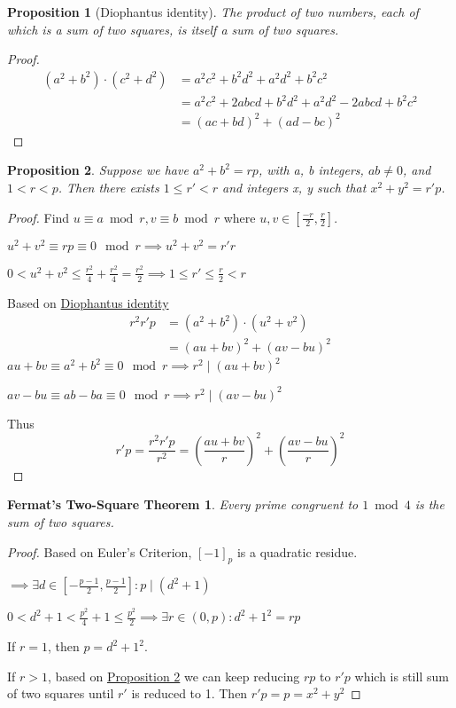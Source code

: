 \documentclass{article}
\newtheorem*{thm}{Fermat's Two-Square Theorem}
\newtheorem{prop}{Proposition}
\theoremstyle{definition}\newtheorem{definition}{Definition}
\begin{document}
	\begin{prop}[Diophantus identity] \label{Diophantus identity}
		The product of two numbers, each of which is a sum of two squares, is itself a sum of two squares.
	\end{prop}
	\begin{proof}
		\begin{align*}
			(a^2+b^2)\cdot (c^2+d^2) &= a^2c^2+b^2d^2+a^2d^2+b^2c^2 \\
			&= a^2c^2+2abcd+b^2d^2+a^2d^2-2abcd+b^2c^2 \\
			&= (ac+bd)^2+(ad-bc)^2
		\end{align*}
	\end{proof}

	\begin{prop} \label{Red}
		 Suppose we have $a^2 + b^2 = rp$, with a, b integers, $ab\neq0$, and $1 < r < p$. Then there exists $1 \leq r' < r$ and integers x, y such that $x^2 + y^2 = r'p$.
	\end{prop}
	\begin{proof}
		Find $u\equiv a \bmod r , v\equiv b \bmod r$ where $u,v \in [\frac{-r}{2},\frac{r}{2}]$. 
		
		$u^2+v^2 \equiv rp \equiv 0 \mod r \implies u^2+v^2=r' r$
				
		$0<u^2+v^2 \leq \frac{r^2}{4} + \frac{r^2}{4}=\frac{r^2}{2} \implies 1 \leq r'\leq \frac{r}{2} < r$
		
		Based on \hyperref[Diophantus identity]{Diophantus identity}
		\begin{align*}
			r^2r'p &= (a^2+b^2)\cdot(u^2+v^2)\\
					&= (au+bv)^2 + (av-bu)^2
		\end{align*} 
		$au+bv \equiv a^2+b^2 \equiv 0 \mod r \implies r^2 \mid (au+bv)^2$
		
		$av-bu \equiv ab-ba \equiv 0 \mod r \implies r^2 \mid (av-bu)^2$
		
		Thus
		\begin{equation*}
			r'p=\frac{r^2r'p}{r^2}=(\frac{au+bv}{r})^2 + (\frac{av-bu}{r})^2
		\end{equation*}
	\end{proof}

	\begin{thm}
		Every prime congruent to $1 \bmod 4$ is the sum of two squares.
	\end{thm}
	\begin{proof}
		Based on Euler's Criterion, $[-1]_p$ is a quadratic residue. 
		
		$\implies \exists d \in [-\frac{p-1}{2},\frac{p-1}{2}] : p \mid (d^2+1)$ 
		
		$0<d^2+1<\frac{p^2}{4}+1 \leq \frac{p^2}{2} \implies \exists r \in (0, p) : d^2+1^2=rp$
		
		If $r=1$, then $p=d^2+1^2$.
		
		If $r>1$, based on \hyperref[Red]{Proposition 2} we can keep reducing $rp$ to $r'p$ which is still sum of two squares until $r'$ is reduced to 1. Then $r'p=p=x^2+y^2$ 
	\end{proof}		
\end{document}
